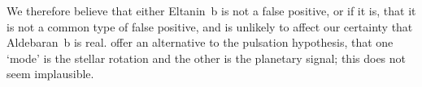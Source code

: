 \documentclass[modern]{aastex61}
\begin{document}
We therefore believe that either Eltanin~b is not a false positive, or if it is, that it is not a common type of false positive, and is unlikely to affect our certainty that Aldebaran~b is real. \citet{2018arXiv180105239H} offer an alternative to the pulsation hypothesis, that one `mode' is the stellar rotation and the other is the planetary signal; this does not seem implausible.



\end{document}

